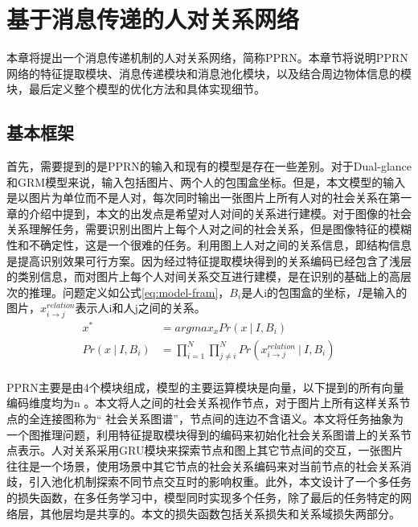 
\chapter{基于消息传递的人对关系网络}
\label{ch:model}

本章将提出一个消息传递机制的人对关系网络，简称PPRN。本章节将说明PPRN网络的特征提取模块、消息传递模块和消息池化模块，以及结合周边物体信息的模块，最后定义整个模型的优化方法和具体实现细节。


\section{基本框架}
首先，需要提到的是PPRN的输入和现有的模型是存在一些差别。对于Dual-glance和GRM模型来说，输入包括图片、两个人的包围盒坐标。但是，本文模型的输入是以图片为单位而不是人对，每次同时输出一张图片上所有人对的社会关系在第一章的介绍中提到，本文的出发点是希望对人对间的关系进行建模。对于图像的社会关系理解任务，需要识别出图片上每个人对之间的社会关系，但是图像特征的模糊性和不确定性，这是一个很难的任务。利用图上人对之间的关系信息，即结构信息是提高识别效果可行方案。因为经过特征提取模块得到的关系编码已经包含了浅层的类别信息，而对图片上每个人对间关系交互进行建模，是在识别的基础上的高层次的推理。问题定义如公式\ref{eq:model-fram}，$B_{i}$是人i的包围盒的坐标，$I$是输入的图片，$x_{i \rightarrow j}^{relation}$表示人i和人j之间的关系。
\begin{equation} \label{eq:model-fram}
\begin{split}
    x^{*} &= argmax_{x}Pr(x~|~I,B_{i}) \\
    Pr(x~|~I,B_{i}) &= \prod_{i=1}^{N}\prod_{j \neq i}^{N}Pr(x_{i \rightarrow j}^{relation}~|~I,B_{i}) \\
\end{split}
\end{equation}

PPRN主要是由4个模块组成，模型的主要运算模块是向量，以下提到的所有向量编码维度均为n 。本文将人之间的社会关系视作节点，对于图片上所有这样关系节点的全连接图称为`` 社会关系图谱''，节点间的连边不含语义。本文将任务抽象为一个图推理问题，利用特征提取模块得到的编码来初始化社会关系图谱上的关系节点表示。人对关系采用GRU模块来探索节点和图上其它节点间的交互，一张图片往往是一个场景，使用场景中其它节点的社会关系编码来对当前节点的社会关系消歧，引入池化机制探索不同节点交互时的影响权重。此外，本文设计了一个多任务的损失函数，在多任务学习中，模型同时实现多个任务，除了最后的任务特定的网络层，其他层均是共享的。本文的损失函数包括关系损失和关系域损失两部分。

